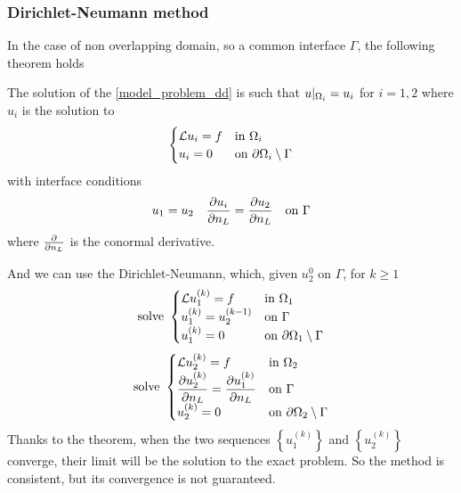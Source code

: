\subsubsection*{Dirichlet-Neumann method}
In the case of non overlapping domain, so a common interface \(\Gamma\), the following theorem holds 
\begin{theorem}
    The solution of the \eqref{model_problem_dd} is such that \(u\vert_{\Omega_i} = u_i\) for \(i=1,2\) where \(u_i\) is the solution to 
    \begin{equation*}
        \begin{cases}
            \mathcal{L} u_i = f & \text{in } \Omega_i \\
            u_i = 0 & \text{on } {\partial\Omega}_i \setminus \Gamma
        \end{cases}
    \end{equation*}
    with interface conditions
    \begin{equation*}
        u_1 =  u_2 \quad \partialderivative{u_i}{n_L} = \partialderivative{u_2}{n_L} \quad \txt{on } \Gamma
    \end{equation*}
    where \(\pderivative{n_L}\) is the conormal derivative.
\end{theorem}
And we can use the Dirichlet-Neumann, which, given \(u_2^0\) on \(\Gamma\), for \(k \geq 1\) 
\begin{equation*}
    \text{solve }\begin{cases}
        \mathcal{L} u^{(k)}_1 = f & \text{in } \Omega_1 \\
        u^{(k)}_1 = u^{(k-1)}_2 & \text{on } \Gamma \\
        u^{(k)}_1 = 0 & \text{on } {\partial\Omega}_1\setminus \Gamma
    \end{cases}
\end{equation*}
\begin{equation*}
    \txt{solve }\begin{cases}
        \loperator u^{(k)}_2 = f & \txt{in } \Omega_2 \\
        \displaystyle \partialderivative{u^{(k)}_2}{n_L} = \partialderivative{u_1^{(k)}}{n_L} & \txt{on } \Gamma \\
        u^{(k)}_2 = 0 & \txt{on } \boundary_2\setminus \Gamma
    \end{cases}
\end{equation*}
Thanks to the theorem, when the two sequences \(\left\{ u^{(k)}_1 \right\}\) and \(\left\{ u^{(k)}_2 \right\}\) converge, their limit will be the solution to the exact problem. So the method is consistent, but its convergence is not guaranteed.

